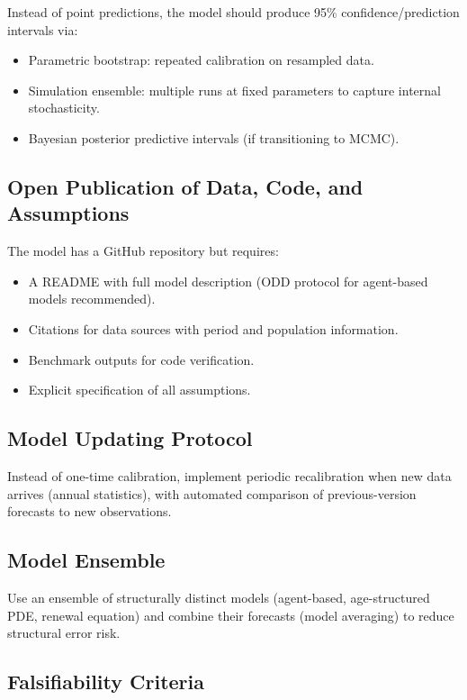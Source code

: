 \documentclass[12pt,a4paper]{article}
\begin{document}
Instead of point predictions, the model should produce 95\% confidence/prediction intervals via:
\begin{itemize}[nosep]
    \item Parametric bootstrap: repeated calibration on resampled data.
    \item Simulation ensemble: multiple runs at fixed parameters to capture internal stochasticity.
    \item Bayesian posterior predictive intervals (if transitioning to MCMC).
\end{itemize}

\subsection{Open Publication of Data, Code, and Assumptions}

The model has a GitHub repository but requires:
\begin{itemize}[nosep]
    \item A README with full model description (ODD protocol for agent-based models recommended).
    \item Citations for data sources with period and population information.
    \item Benchmark outputs for code verification.
    \item Explicit specification of all assumptions.
\end{itemize}

\subsection{Model Updating Protocol}

Instead of one-time calibration, implement periodic recalibration when new data arrives (annual statistics), with automated comparison of previous-version forecasts to new observations.

\subsection{Model Ensemble}

Use an ensemble of structurally distinct models (agent-based, age-structured PDE, renewal equation) and combine their forecasts (model averaging) to reduce structural error risk.

\subsection{Falsifiability Criteria}
\end{document}
